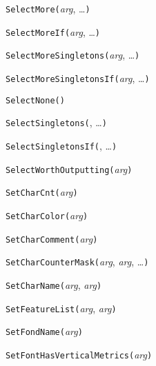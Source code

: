 \noindent\texttt{SelectMore(}\textit{arg}, \ldots\texttt{)}


\noindent\texttt{SelectMoreIf(}\textit{arg}, \ldots\texttt{)}


\noindent\texttt{SelectMoreSingletons(}\textit{arg}, \ldots\texttt{)}


\noindent\texttt{SelectMoreSingletonsIf(}\textit{arg}, \ldots\texttt{)}


\noindent\texttt{SelectNone(}\texttt{)}


\noindent\texttt{SelectSingletons(}, \ldots\texttt{)}


\noindent\texttt{SelectSingletonsIf(}, \ldots\texttt{)}


\noindent\texttt{SelectWorthOutputting(}\textit{arg}\texttt{)}


\noindent\texttt{SetCharCnt(}\textit{arg}\texttt{)}


\noindent\texttt{SetCharColor(}\textit{arg}\texttt{)}


\noindent\texttt{SetCharComment(}\textit{arg}\texttt{)}


\noindent\texttt{SetCharCounterMask(}\textit{arg}, \textit{arg}, \ldots\texttt{)}


\noindent\texttt{SetCharName(}\textit{arg}, \textit{arg}\texttt{)}


\noindent\texttt{SetFeatureList(}\textit{arg}, \textit{arg}\texttt{)}


\noindent\texttt{SetFondName(}\textit{arg}\texttt{)}


\noindent\texttt{SetFontHasVerticalMetrics(}\textit{arg}\texttt{)}

